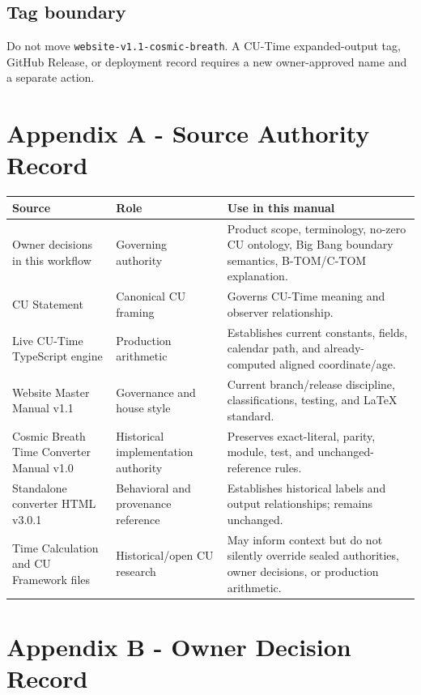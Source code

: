\documentclass[11pt,letterpaper]{article}
\newcommand{\release}[1]{\texttt{#1}}
\begin{document}
\subsection{Tag boundary}

Do not move \release{website-v1.1-cosmic-breath}. A CU-Time expanded-output tag,
GitHub Release, or deployment record requires a new owner-approved name and a
separate action.

\section{Appendix A - Source Authority Record}

\begin{longtable}{L{2.35in}L{1.30in}L{2.55in}}
\toprule
\textbf{Source} & \textbf{Role} & \textbf{Use in this manual} \\
\midrule
Owner decisions in this workflow & Governing authority & Product scope, terminology, no-zero CU ontology, Big Bang boundary semantics, B-TOM/C-TOM explanation. \\
CU Statement & Canonical CU framing & Governs CU-Time meaning and observer relationship. \\
Live CU-Time TypeScript engine & Production arithmetic & Establishes current constants, fields, calendar path, and already-computed aligned coordinate/age. \\
Website Master Manual v1.1 & Governance and house style & Current branch/release discipline, classifications, testing, and LaTeX standard. \\
Cosmic Breath Time Converter Manual v1.0 & Historical implementation authority & Preserves exact-literal, parity, module, test, and unchanged-reference rules. \\
Standalone converter HTML v3.0.1 & Behavioral and provenance reference & Establishes historical labels and output relationships; remains unchanged. \\
Time Calculation and CU Framework files & Historical/open CU research & May inform context but do not silently override sealed authorities, owner decisions, or production arithmetic. \\
\bottomrule
\end{longtable}

\section{Appendix B - Owner Decision Record}
\end{document}
